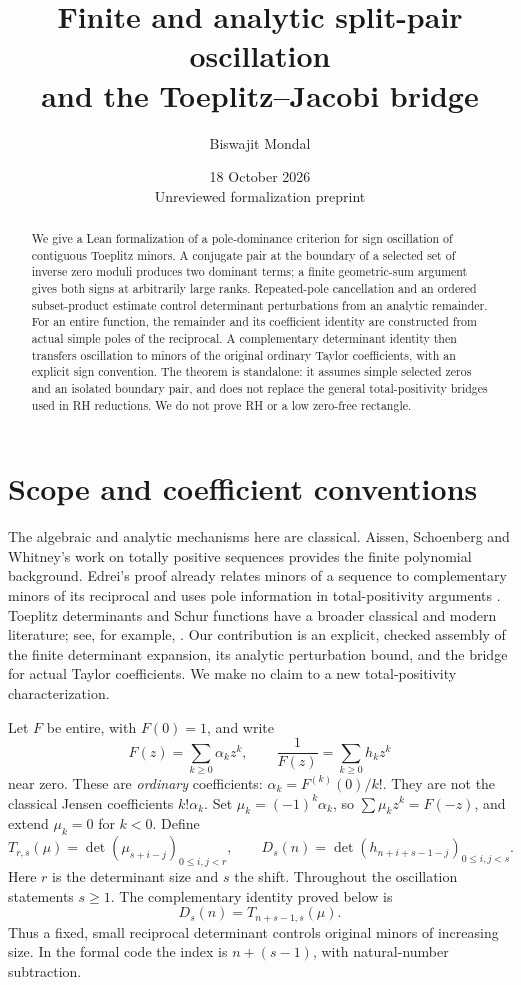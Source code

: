 \documentclass[11pt]{amsart}
\title[Split-pair oscillation and the Toeplitz--Jacobi bridge]{Finite and analytic split-pair oscillation\\and the Toeplitz--Jacobi bridge}
\author{Biswajit Mondal}
\date{18 October 2026\\Unreviewed formalization preprint}
\begin{document}
\begin{abstract}
We give a Lean formalization of a pole-dominance criterion for sign oscillation of contiguous Toeplitz minors. A conjugate pair at the boundary of a selected set of inverse zero moduli produces two dominant terms; a finite geometric-sum argument gives both signs at arbitrarily large ranks. Repeated-pole cancellation and an ordered subset-product estimate control determinant perturbations from an analytic remainder. For an entire function, the remainder and its coefficient identity are constructed from actual simple poles of the reciprocal. A complementary determinant identity then transfers oscillation to minors of the original ordinary Taylor coefficients, with an explicit sign convention. The theorem is standalone: it assumes simple selected zeros and an isolated boundary pair, and does not replace the general total-positivity bridges used in RH reductions. We do not prove RH or a low zero-free rectangle.
\end{abstract}
\maketitle

\section{Scope and coefficient conventions}
The algebraic and analytic mechanisms here are classical. Aissen, Schoenberg and Whitney's work on totally positive sequences \cite{asw} provides the finite polynomial background. Edrei's proof already relates minors of a sequence to complementary minors of its reciprocal and uses pole information in total-positivity arguments \cite{edrei}. Toeplitz determinants and Schur functions have a broader classical and modern literature; see, for example, \cite{bumpdiaconis}. Our contribution is an explicit, checked assembly of the finite determinant expansion, its analytic perturbation bound, and the bridge for actual Taylor coefficients. We make no claim to a new total-positivity characterization.

Let $F$ be entire, with $F(0)=1$, and write
\[
 F(z)=\sum_{k\ge0}\alpha_k z^k,\qquad
 \frac1{F(z)}=\sum_{k\ge0}h_k z^k
\]
near zero. These are \emph{ordinary} coefficients:
$\alpha_k=F^{(k)}(0)/k!$. They are not the classical Jensen coefficients $k!\alpha_k$.
Set $\mu_k=(-1)^k\alpha_k$, so $\sum\mu_kz^k=F(-z)$, and extend $\mu_k=0$ for $k<0$. Define
\[
 T_{r,s}(\mu)=\det(\mu_{s+i-j})_{0\le i,j<r},\qquad
 D_s(n)=\det(h_{n+i+s-1-j})_{0\le i,j<s}.
\]
Here $r$ is the determinant size and $s$ the shift. Throughout the oscillation statements $s\ge1$. The complementary identity proved below is
\begin{equation}\label{eq:jacobi}
 D_s(n)=T_{n+s-1,s}(\mu).
\end{equation}
Thus a fixed, small reciprocal determinant controls original minors of increasing size. In the formal code the index is $n+(s-1)$, with natural-number subtraction.
\end{document}
